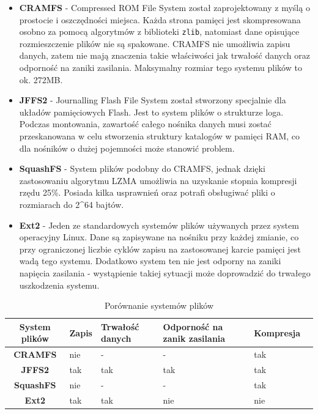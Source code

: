 \documentclass[a4paper,12pt]{book}
\begin{document}
				\begin{itemize}
					\item \textbf{CRAMFS} - Compressed ROM File System został zaprojektowany z myślą o prostocie i oszczędności miejsca. Każda strona pamięci jest skompresowana osobno za pomocą algorytmów z biblioteki \texttt{zlib}, natomiast dane opisujące rozmieszczenie plików nie są spakowane. CRAMFS nie umożliwia zapisu danych, zatem nie mają znaczenia takie właściwości jak trwałość danych oraz odporność na zaniki zasilania. Maksymalny rozmiar tego systemu plików to ok. 272MB.
					\item \textbf{JFFS2} - Journalling Flash File System został stworzony specjalnie dla układów pamięciowych Flash. Jest to system plików o strukturze loga. Podczas montowania, zawartość całego nośnika danych musi zostać przeskanowana w celu stworzenia struktury katalogów w pamięci RAM, co dla nośników o dużej pojemności może stanowić problem.
					\item \textbf{SquashFS} - System plików podobny do CRAMFS, jednak dzięki zastosowaniu algorytmu LZMA umożliwia na uzyskanie stopnia kompresji rzędu 25\%. Posiada kilka usprawnień oraz potrafi obsługiwać pliki o rozmiarach do 2\textasciicircum64 bajtów.
					\item \textbf{Ext2} - Jeden ze standardowych systemów plików używanych przez system operacyjny Linux. Dane są zapisywane na nośniku przy każdej zmianie, co przy ograniczonej liczbie cyklów zapisu na zastosowanej karcie pamięci jest wadą tego systemu. Dodatkowo system ten nie jest odporny na zaniki napięcia zasilania - wystąpienie takiej sytuacji może doprowadzić do trwałego uszkodzenia systemu.
				\end{itemize}
				\begin{table}[h]
					\extrarowheight=3pt
					\begin{tabularx}{\textwidth}{|c|X|X|X|X|X|}
						\hline \textbf{System plików} & \textbf{Zapis} & \textbf{Trwałość danych} & \textbf{Odporność na zanik zasilania} & \textbf{Kompresja} \\
						\hline \textbf{CRAMFS} & nie & - & - & tak \\
						\hline \textbf{JFFS2} & tak & tak & tak & tak \\
						\hline \textbf{SquashFS} & nie & - & - & tak \\
						\hline \textbf{Ext2} & tak & tak & nie & nie \\
						\hline
					\end{tabularx}
					\caption{Porównanie systemów plików}
					\label{tab:fs_comparison}
				\end{table}
\end{document}
